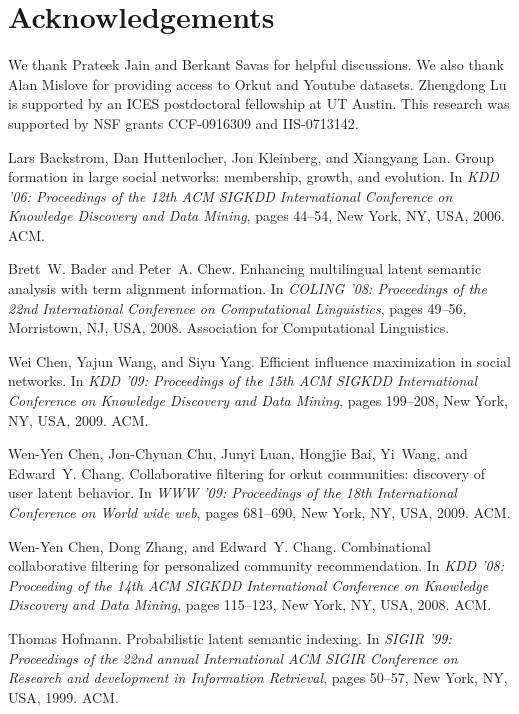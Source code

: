 \documentclass{sig-alternate}
\begin{document}
\section{Acknowledgements}
We thank Prateek Jain and Berkant Savas for helpful discussions. We also thank Alan Mislove \cite{Mislove} for providing access to Orkut and Youtube datasets. Zhengdong Lu is supported by an ICES postdoctoral fellowship at UT Austin. This research was supported by NSF grants CCF-0916309 and IIS-0713142.

\begin{thebibliography}{10}

Lars Backstrom, Dan Huttenlocher, Jon Kleinberg, and Xiangyang Lan.
\newblock Group formation in large social networks: membership, growth, and
  evolution.
\newblock In {\em KDD '06: Proceedings of the 12th ACM SIGKDD International
  Conference on Knowledge Discovery and Data Mining}, pages 44--54, New York,
  NY, USA, 2006. ACM.

Brett~W. Bader and Peter~A. Chew.
\newblock Enhancing multilingual latent semantic analysis with term alignment
  information.
\newblock In {\em COLING '08: Proceedings of the 22nd International Conference
  on Computational Linguistics}, pages 49--56, Morristown, NJ, USA, 2008.
  Association for Computational Linguistics.

Wei Chen, Yajun Wang, and Siyu Yang.
\newblock Efficient influence maximization in social networks.
\newblock In {\em KDD '09: Proceedings of the 15th ACM SIGKDD International
  Conference on Knowledge Discovery and Data Mining}, pages 199--208, New York,
  NY, USA, 2009. ACM.

Wen-Yen Chen, Jon-Chyuan Chu, Junyi Luan, Hongjie Bai, Yi~Wang, and Edward~Y.
  Chang.
\newblock Collaborative filtering for orkut communities: discovery of user
  latent behavior.
\newblock In {\em WWW '09: Proceedings of the 18th International Conference on
  World wide web}, pages 681--690, New York, NY, USA, 2009. ACM.

Wen-Yen Chen, Dong Zhang, and Edward~Y. Chang.
\newblock Combinational collaborative filtering for personalized community
  recommendation.
\newblock In {\em KDD '08: Proceeding of the 14th ACM SIGKDD International
  Conference on Knowledge Discovery and Data Mining}, pages 115--123, New York,
  NY, USA, 2008. ACM.

Thomas Hofmann.
\newblock Probabilistic latent semantic indexing.
\newblock In {\em SIGIR '99: Proceedings of the 22nd annual International ACM
  SIGIR Conference on Research and development in Information Retrieval}, pages
  50--57, New York, NY, USA, 1999. ACM.


\end{thebibliography}
\end{document}
